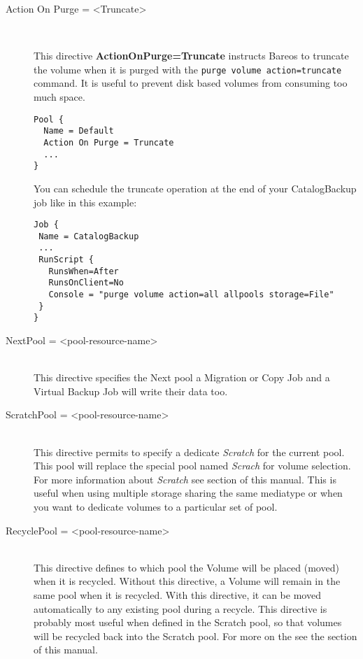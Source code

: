 \begin{description}
\item [Action On Purge = {\textless}Truncate{\textgreater}] \hfill \\

This directive \textbf{ActionOnPurge=Truncate} instructs Bareos to truncate the
volume when it is purged with the \texttt{purge volume action=truncate}
command. It is useful to prevent disk based volumes from consuming too much
space.

\begin{verbatim}
Pool {
  Name = Default
  Action On Purge = Truncate
  ...
}
\end{verbatim}

You can schedule the truncate operation at the end of your CatalogBackup job
like in this example:

\begin{verbatim}
Job {
 Name = CatalogBackup
 ...
 RunScript {
   RunsWhen=After
   RunsOnClient=No
   Console = "purge volume action=all allpools storage=File"
 }
}
\end{verbatim}

\item [NextPool = {\textless}pool-resource-name{\textgreater}] \hfill \\
This directive specifies the Next pool a Migration or Copy Job
and a Virtual Backup Job will write their data too.

\label{PoolScratchPool}
\item [ScratchPool = {\textless}pool-resource-name{\textgreater}] \hfill \\
This directive permits to specify a dedicate \textsl{Scratch} for the
current pool. This pool will replace the special pool named \textsl{Scrach}
for volume selection. For more information about \textsl{Scratch} see
 section of this manual. This is useful
when using multiple storage sharing the same mediatype or when you want to
dedicate volumes to a particular set of pool.

\label{PoolRecyclePool}
\item [RecyclePool = {\textless}pool-resource-name{\textgreater}] \hfill \\
This directive defines to which pool
the Volume will be placed (moved) when it is recycled. Without
this directive, a Volume will remain in the same pool when it is
recycled. With this directive, it can be moved automatically to any
existing pool during a recycle. This directive is probably most
useful when defined in the Scratch pool, so that volumes will
be recycled back into the Scratch pool. For more on the see the
 section of this manual.


\end{description}
